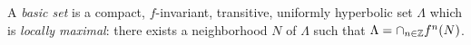 \documentclass[11pt,openany,leqno]{article}
\begin{document}
%
%
%
%
%
%
% 
%





\begin{defi} 
A \emph{basic set}  is a compact, $f$-invariant, transitive,  uniformly hyperbolic  set $\Lambda$ which is \emph{locally maximal}:
there exists   a neighborhood $N$ of $\Lambda$ such that $\Lambda = \cap_{n\in \mathbb Z} f^n(N)$.
\end{defi}

\end{document}
